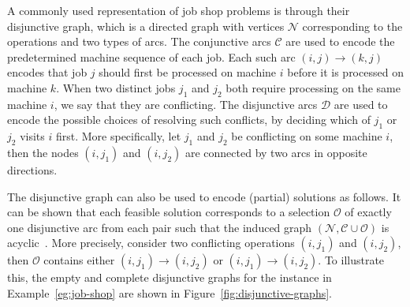 \documentclass[a4paper]{report}
\theoremstyle{definition}
\theoremstyle{plain}
\begin{document}
A commonly used representation of job shop problems is through their disjunctive
graph, which is a directed graph with vertices $\mathcal{N}$ corresponding to the
operations and two types of arcs.
%
The conjunctive arcs $\mathcal{C}$ are used to encode the predetermined machine
sequence of each job. Each such arc $(i, j) \rightarrow (k, j)$ encodes that job
$j$ should first be processed on machine $i$ before it is processed on machine
$k$.
%
When two distinct jobs $j_{1}$ and $j_{2}$ both require processing on the same
machine $i$, we say that they are conflicting.
%
The disjunctive arcs $\mathcal{D}$ are used to encode the possible choices of
resolving such conflicts, by deciding which of $j_{1}$ or $j_{2}$ visits $i$
first.
%
More specifically, let $j_{1}$ and $j_{2}$ be conflicting on some machine $i$,
then the nodes $(i,j_{1})$ and $(i,j_{2})$ are connected by two arcs in opposite
directions.

The disjunctive graph can also be used to encode (partial) solutions as follows.
%
It can be shown that each feasible solution corresponds to a selection
$\mathcal{O}$ of exactly one disjunctive arc from each pair such that the
induced graph $(\mathcal{N}, \mathcal{C} \cup \mathcal{O})$ is
acyclic~\cite{pinedoSchedulingTheoryAlgorithms2016}.
%
More precisely, consider two conflicting operations $(i,j_{1})$ and $(i,j_{2})$,
then $\mathcal{O}$ contains either $(i,j_{1}) \rightarrow (i,j_{2})$ or
$(i,j_{1}) \rightarrow (i,j_{2})$.
%
To illustrate this, the empty and complete disjunctive graphs for the instance
in Example~\ref{eg:job-shop} are shown in Figure~\ref{fig:disjunctive-graphs}.
\end{document}
